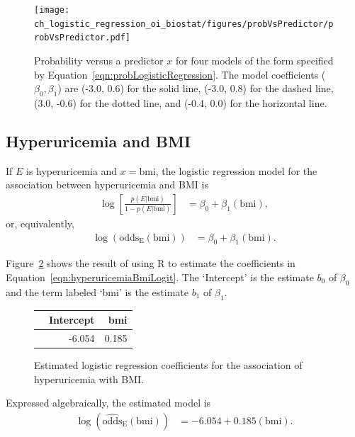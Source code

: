 \begin{figure}[!htb]
	\centering
	\texttt{[image: ch\_logistic\_regression\_oi\_biostat/figures/probVsPredictor/probVsPredictor.pdf]}
    \caption{Probability versus a predictor $x$ for four models of the form specified by Equation~\ref{eqn:probLogisticRegression}. The model coefficients ($\beta_0, \beta_1$) are (-3.0, 0.6) for the solid line, (-3.0, 0.8) for the dashed line, (3.0, -0.6) for the dotted line, and (-0.4, 0.0) for the horizontal line.}
    \label{figure:probVsPredictor}
\end{figure}


\subsection{Hyperuricemia and BMI}
\label{section:analyzingHyperuricemia}

If $E$ is hyperuricemia and $x = \text{bmi}$, the logistic regression model for the association between hyperuricemia and BMI is
\begin{align*}
  \log\left[\frac{p(E|\text{bmi})}{1-p(E|\text{bmi})}\right] &=  \beta_0 + \beta_1 (\text{bmi}),
\end{align*}
or, equivalently,
\begin{align}
  \log(\text{odds}_\text{E}(\text{bmi})) &=  \beta_0 + \beta_1 (\text{bmi}).
   \label{eqn:hyperuricemiaBmiLogit}
\end{align}

Figure~\ref{figure:bmiHyperuricemiaLogRegCoeff} shows the result of using \textsf{R} to estimate the coefficients in Equation~\ref{eqn:hyperuricemiaBmiLogit}.  The `Intercept' is the estimate $b_0$  of $\beta_0$ and the term labeled `bmi' is the estimate $b_1$ of $\beta_1$.

\begin{figure}[ht]
\centering
\begin{tabular}{rrr}
  \hline
 & Intercept & bmi  \\
  \hline
 & -6.054 & 0.185  \\
   \hline
\end{tabular}
\caption{Estimated logistic regression coefficients for the association of hyperuricemia with BMI.}
\label{figure:bmiHyperuricemiaLogRegCoeff}
\end{figure}

Expressed algebraically, the estimated model is
\begin{align}
  \log(\widehat{\text{odds}}_\text{E}(\text{bmi})) &= -6.054 + 0.185 (\text{bmi}).
  \label{eqn:bmiHyperuricemiaModel}
\end{align}

